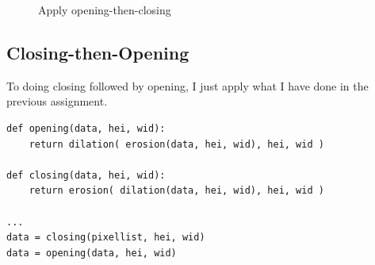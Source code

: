 \documentclass[14pt,a4paper]{extarticle}
\begin{document}
\begin{figure}[H]
\centering
	\hfill
\caption{Apply opening-then-closing}
\end{figure}

\subsection{Closing-then-Opening}

To doing closing followed by opening, I just apply what I have done in the previous assignment.
\begin{lstlisting}
def opening(data, hei, wid):
	return dilation( erosion(data, hei, wid), hei, wid )

def closing(data, hei, wid):
	return erosion( dilation(data, hei, wid), hei, wid )

...
data = closing(pixellist, hei, wid)
data = opening(data, hei, wid)
\end{lstlisting}
\end{document}
